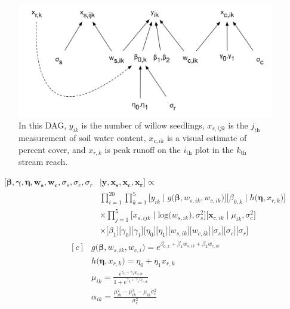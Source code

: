 \documentclass[12pt, oneside]{article}
\begin{document}
\begin{enumerate}[leftmargin=*]
\begin{figure}[H]
\begin{center}
\includegraphics[width=5.5in]{WillowMultiLevelDAG.png}
\caption{In this DAG, $y_{ik}$ is the number of willow seedlings, $x_{s,ijk}$ is the $j_{\textrm{th}}$ measurement of soil water content, $x_{c,ik}$ is a visual estimate of percent cover, and $x_{r,k}$ is peak runoff on the $i_{\textrm{th}}$ plot in the $k_{\textrm{th}}$ stream reach.}
\end{center}
\end{figure}
\begin{align*}
\big[\bm{\beta}, \bm{\gamma}, \bm{\eta}, \bm{w_{s}}, \bm{w_{c}}, \sigma_{s}, \sigma_{c}, \sigma_{r} & \mid \bm{y}, \bm{x_{s}}, \bm{x_{c}},  \bm{x_{r}} \big] \varpropto \\
& \prod_{i=1}^{20} \prod_{k=1}^{5} \big[y_{ik} \mid g\big(\bm{\beta}, w_{s,ik}, w_{c,ik}\big)\big]  \big[\beta_{0,k} \mid h\big(\bm{\eta}, x_{r,k}\big)\big] \\
& \times \prod_{j=1}^{5} \big[x_{s,ijk} \mid \textrm{log}\big(w_{s,ik}\big), \sigma^{2}_{s} \big] \big[\bm{x}_{c,ik} \mid \mu_{ik}, \sigma^{2}_{c} \big] \\
& \times \big[\beta_{1} \big] \big[\gamma_{0} \big] \big[\gamma_{1} \big] \big[\eta_{0} \big] \big[\eta_{1} \big]
\big[w_{s,ik}\big] \big[w_{c,ik}\big] \big[\sigma_{s}\big] \big[\sigma_{c}\big] \big[\sigma_{r}\big]         
\end{align*}
\begin{equation*}
\begin{aligned}[c]
&g\big(\bm{\beta}, w_{s,ik}, w_{c,i} \big) =e^{\beta_{0,k} + \beta_{1} w_{s,ik} + \beta_{2} w_{c,ik}}\\
&h\big(\bm{\eta}, x_{r,k} \big) =\eta_{0} + \eta_{1} x_{r,k}\\
&\mu_{ik}= \frac{e^{\gamma_{0} + \gamma_1 w_{c,ik}}}{1 + e^{\gamma_{0} + \gamma_1 w_{c,ik}}} \\
&\alpha_{ik} =  \frac{\mu_{ik}^{2} - \mu_{ik}^{3} - \mu_{ik}\sigma^{2}_{c}}{\sigma^{2}_{c}} \\

\end{aligned}
\end{equation*}
\end{enumerate}
\end{document}
